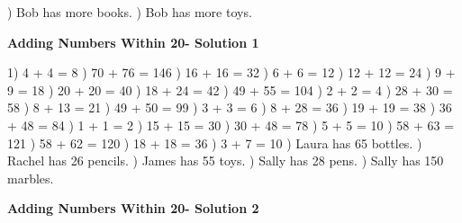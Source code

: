 \documentclass{article}%
\begin{document}
) Bob has more books.%
) Bob has more toys.%
\newline%
\newpage%
\large%
\begin{center}%
\textbf{Adding Numbers Within 20- Solution 1}%
\newline%
\end{center} \normalsize%
1) 4 + 4 = 8%
) 70 + 76 = 146%
) 16 + 16 = 32%
) 6 + 6 = 12%
) 12 + 12 = 24%
) 9 + 9 = 18%
) 20 + 20 = 40%
) 18 + 24 = 42%
) 49 + 55 = 104%
) 2 + 2 = 4%
) 28 + 30 = 58%
) 8 + 13 = 21%
) 49 + 50 = 99%
) 3 + 3 = 6%
) 8 + 28 = 36%
) 19 + 19 = 38%
) 36 + 48 = 84%
) 1 + 1 = 2%
) 15 + 15 = 30%
) 30 + 48 = 78%
) 5 + 5 = 10%
) 58 + 63 = 121%
) 58 + 62 = 120%
) 18 + 18 = 36%
) 3 + 7 = 10%
) Laura has 65 bottles.%
) Rachel has 26 pencils.%
) James has 55 toys.%
) Sally has 28 pens.%
) Sally has 150 marbles.%
\newline%
\newpage%
\large%
\begin{center}%
\textbf{Adding Numbers Within 20- Solution 2}%
\newline%
\end{center} \normalsize%
\end{document}
